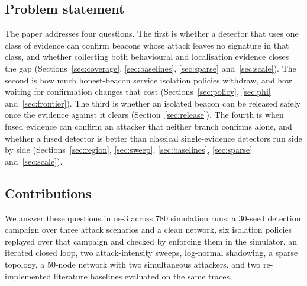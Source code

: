 \subsection{Problem statement}

The paper addresses four questions. The first is whether a detector that
uses one class of evidence can confirm beacons whose attack leaves no
signature in that class, and whether collecting both behavioural and
localisation evidence closes the gap (Sections~\ref{sec:coverage},
\ref{sec:baselines}, \ref{sec:sparse} and~\ref{sec:scale}). The second is how
much honest-beacon service isolation policies withdraw, and how waiting for
confirmation changes that cost (Sections~\ref{sec:policy}, \ref{sec:phi}
and~\ref{sec:frontier}). The third is whether an isolated beacon can be released
safely once the evidence against it clears (Section~\ref{sec:release}). The
fourth is when fused evidence can confirm an attacker that neither branch
confirms alone, and whether a fused detector is better than classical
single-evidence detectors run side by side (Sections~\ref{sec:region},
\ref{sec:sweep}, \ref{sec:baselines}, \ref{sec:sparse} and~\ref{sec:scale}).

\subsection{Contributions}

We answer these questions in ns-3 across 780 simulation runs: a 30-seed
detection campaign over three attack scenarios and a clean network, six
isolation policies replayed over that campaign and checked by enforcing them
in the simulator, an iterated closed loop, two attack-intensity sweeps,
log-normal shadowing, a sparse topology, a 50-node network with two
simultaneous attackers, and two re-implemented literature baselines evaluated
on the same traces.

